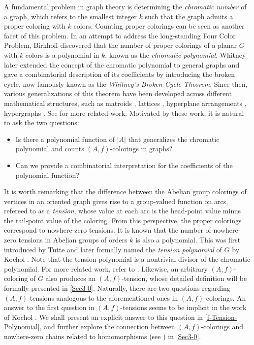 \documentclass[12pt]{article}%
\numberwithin{equation}{section}
\begin{document}
A fundamental problem in graph theory is determining the {\em chromatic number} of a graph, which refers to the smallest integer $k$ such that the graph admits a proper coloring with $k$ colors. Counting proper colorings can be seen as another facet of this problem. In an attempt to address the long-standing Four Color Problem, Birkhoff \cite{Birkhoff1912} discovered that the number of proper colorings of a planar $G$ with $k$ colors is a polynomial in $k$,  known as the {\em chromatic polynomial}. Whitney \cite{Whitney1932,Whitney1932-1} later extended the concept of the chromatic polynomial to general graphs and gave a combinatorial description of its coefficients by introducing the broken cycle, now famously known as the  {\em Whitney's Broken Cycle Theorem}. Since then, various generalizations of this theorem have been developed across different mathematical structures, such as matroids \cite{Brylawski1977,Heron1972}, lattices \cite{Blass-Sagan1997,Rota1964}, hyperplane arrangements \cite{Orlik-Terao1992}, hypergraphs \cite{Dohmen1995}.  See \cite{Dohmen-Trinks2014} for more related work. Motivated by these work, it is natural to ask the two questions:
\begin{itemize}
\item Is there a polynomial function of $|A|$ that generalizes the chromatic polynomial and counts $(A,f)$-colorings in graphs?
\item Can we provide a combinatorial interpretation for the coefficients of the polynomial function?
\end{itemize}

It is worth remarking that the difference between the Abelian group colorings of vertices in an oriented graph gives rise to a group-valued function on arcs, refereed to as a {\em tension},  whose value at each arc is the head-point value minus the tail-point value of the coloring. From this perspective, the proper colorings correspond to nowhere-zero tensions. It is known that the number of nowhere-zero tensions in Abelian groups of orders $k$ is also a polynomial. This was first introduced by Tutte \cite{Tutte1954} and later formally named the {\em tension polynomial} of $G$ by Kochol \cite{Kochol2002}. Note that the tension polynomial is a nontrivial divisor of the chromatic polynomial. For more related work, refer to \cite{Chen2007,Kochol2004}. Likewise, an arbitrary $(A,f)$-coloring of $G$ also produces an $(A,f)$-tension, whose detailed definition will be formally presented in \autoref{Sec3-0}. Naturally, there are two questions regarding $(A,f)$-tensions analogous to the aforementioned ones in $(A,f)$-colorings. An answer to the first question in $(A,f)$-tensions seems to be implicit in the work of Kochol \cite{Kochol2024}. We shall present an explicit answer to this question in \autoref{f-Tension-Polynomial}, and further explore the connection  between $(A,f)$-colorings and nowhere-zero chains related to homomorphisms (see \cite{Kochol2024}) in \autoref{Sec3-0}.
\end{document}
